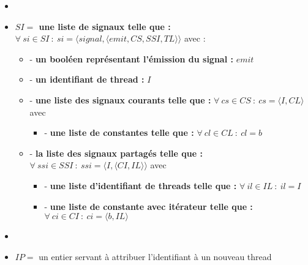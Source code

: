 \documentclass[10pt,a4paper]{report}
\begin{document}
\begin{itemize}
		\item[]
		\item[] \textbf{$SI =$ une liste de signaux telle que :} $\forall~si \in SI~:~si = \langle signal,\langle emit,CS,SSI,TL\rangle\rangle$ avec :
		\begin{itemize}
			\item[] - \textbf{un booléen représentant l'émission du signal :} $emit$
			\item[] - \textbf{un identifiant de thread :} $I$
			\item[] - \textbf{une liste des signaux courants telle que :} $\forall~cs \in CS~:~cs = \langle I,CL\rangle$ avec 
			\begin{itemize}
				\item[] - \textbf{une liste de constantes telle que :} $\forall~cl \in CL~:~cl = b$
			\end{itemize}
			
			\item[] - \textbf{la liste des signaux partagés telle que :} $\forall~ssi \in SSI~:~ssi = \langle I,\langle CI,IL\rangle\rangle$ avec 
			\begin{itemize}
				\item[] - \textbf{une liste d'identifiant de threads telle que :} $\forall~il \in IL~:~il = I$
				\item[] - \textbf{une liste de constante avec itérateur telle que :} $\forall~ci \in CI~:~ci = \langle b, IL\rangle$
			\end{itemize}
		\end{itemize}
		\item[]
		\item[] $IP =$ un entier servant à attribuer l'identifiant à un nouveau thread 
	\end{itemize}
	\bigbreak
	
\end{document}
